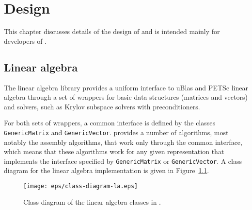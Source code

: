 \chapter{Design}

This chapter discusses details of the design of \dolfin{} and is
intended mainly for developers of \dolfin{}.

\section{Linear algebra}

The linear algebra library provides a uniform interface to uBlas
and PETSc linear algebra through a set of wrappers for basic data
structures (matrices and vectors) and solvers, such as Krylov subspace
solvers with preconditioners.

For both sets of wrappers, a common interface is defined by the
classes \texttt{GenericMatrix} and \texttt{GenericVector}. \dolfin{}
provides a number of algorithms, most notably the assembly algorithms,
that work only through the common interface, which means that these
algorithms work for any given representation that implements the
interface specified by \texttt{GenericMatrix} or
\texttt{GenericVector}. A class diagram for the \dolfin{} linear
algebra implementation is given in Figure~\ref{fig:laclasses}.

\begin{figure}[htbp]
  \begin{center}
    \texttt{[image: eps/class-diagram-la.eps]}
    \caption{Class diagram of the linear algebra classes in \dolfin{}.}
    \label{fig:laclasses}
  \end{center}
\end{figure}

